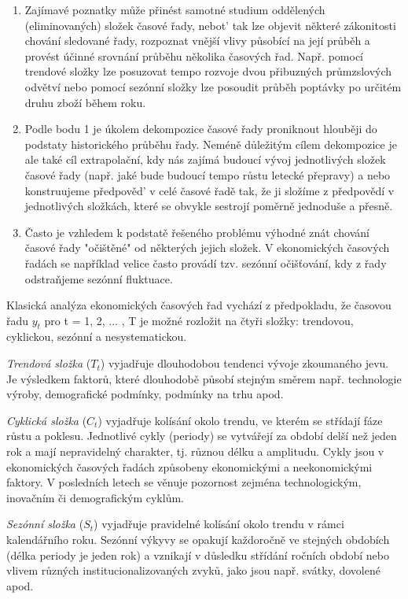 \documentclass[a4paper,12pt,twoside]{scrreprt}
\begin{document}
\begin{enumerate}
\item Zajímavé poznatky může přinést samotné studium oddělených (eliminovaných) složek časové řady, nebot' tak lze objevit některé zákonitosti chování sledované řady, rozpoznat vnější vlivy působící na její průběh a provést účinné srovnání průběhu několika časových řad. Např. pomocí trendové složky lze posuzovat tempo rozvoje dvou přibuzných průmzslových odvětví nebo pomocí sezónní složky lze posoudit průběh poptávky po určitém druhu zboží během roku. 
\item Podle bodu 1 je úkolem dekompozice časové řady proniknout hlouběji do podstaty historického průběhu řady. Neméně důležitým cílem dekompozice je ale také cíl extrapolační, kdy nás zajímá budoucí vývoj jednotlivých složek časové řady (např. jaké bude budoucí tempo růstu letecké přepravy) a nebo konstruujeme předpověd' v celé časové řadě tak, že ji složíme z předpovědí v jednotlivých složkách, které se obvykle sestrojí poměrně jednoduše a přesně. 
\item Často je vzhledem k podstatě řešeného problému výhodné znát chování časové řady "očištěné" od některých jejich složek. V ekonomických časových řadách se například velice často provádí tzv. sezónní očišťování, kdy z řady odstraňjeme sezónní fluktuace. 
\end{enumerate}

Klasická analýza ekonomických časových řad vychází z předpokladu, že časovou
řadu $y_t$ pro t = 1, 2, ... , T je možné rozložit na čtyři složky: trendovou, cyklickou, sezónní a nesystematickou.

\textit{Trendová složka} ($T_t$) vyjadřuje dlouhodobou tendenci vývoje zkoumaného jevu. Je výsledkem faktorů, které dlouhodobě působí stejným směrem např. technologie výroby, demografické podmínky, podmínky na trhu apod.

\textit{Cyklická složka} ($C_t$) vyjadřuje kolísání okolo trendu, ve kterém se střídají fáze růstu a poklesu. Jednotlivé cykly (periody) se vytvářejí za období delší než jeden rok a mají nepravidelný charakter, tj. různou délku a amplitudu. Cykly jsou v ekonomických časových řadách způsobeny ekonomickými a neekonomickými faktory. V posledních letech se věnuje pozornost zejména technologickým, inovačním či demografickým cyklům.

\textit{Sezónní složka} ($S_t$) vyjadřuje pravidelné kolísání okolo trendu v rámci kalendářního roku. Sezónní výkyvy se opakují každoročně ve stejných obdobích (délka periody je jeden rok) a vznikají v důsledku střídání ročních období nebo vlivem různých institucionalizovaných zvyků, jako jsou např. svátky, dovolené apod.
\end{document}
